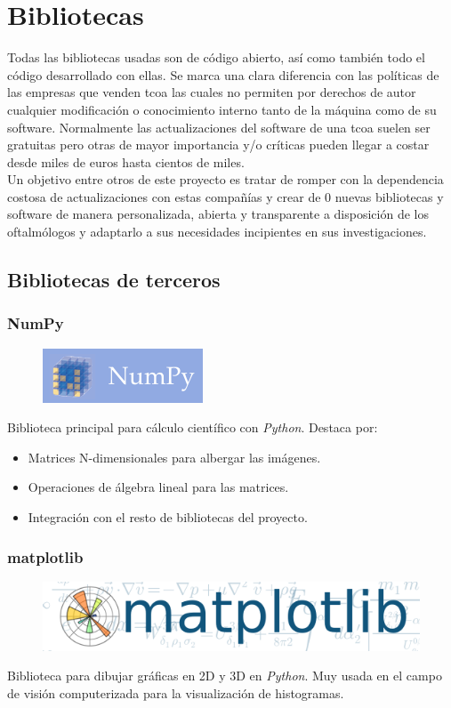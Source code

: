 \chapter{Bibliotecas}
Todas las bibliotecas usadas son de código abierto, así como también
todo el código desarrollado con ellas. Se marca una clara diferencia
con las políticas de las empresas que venden \gls{tcoa} las cuales no
permiten por derechos de autor cualquier modificación o conocimiento
interno tanto de la máquina como de su software. Normalmente las
actualizaciones del software de una \gls{tcoa} suelen ser gratuitas
pero otras de mayor importancia y/o críticas pueden llegar a costar
desde miles de euros hasta cientos de miles. \\
Un objetivo entre otros de este proyecto es tratar de romper con la
dependencia costosa de actualizaciones con estas compañías y crear de
0 nuevas bibliotecas y software de manera personalizada, abierta y
transparente a disposición de los oftalmólogos y adaptarlo a sus
necesidades incipientes en sus investigaciones.

\section{Bibliotecas de terceros}
\subsection{NumPy}
\begin{figure}[H]
  \includegraphics[scale=0.5]{imagenes/logos/numpy_logo.png}
\end{figure}
Biblioteca principal para cálculo científico con
\emph{Python}. Destaca por:
\begin{itemize}
\item Matrices N-dimensionales para albergar las imágenes.
\item Operaciones de álgebra lineal para las matrices.
\item Integración con el resto de bibliotecas del proyecto.
\end{itemize}

\subsection{matplotlib}
\begin{figure}[H]
  \includegraphics[scale=0.2]{imagenes/logos/matplotlib_logo.png}
\end{figure}
Biblioteca para dibujar gráficas en 2D y 3D en \emph{Python}. Muy
usada en el campo de visión computerizada para la visualización de
histogramas.

